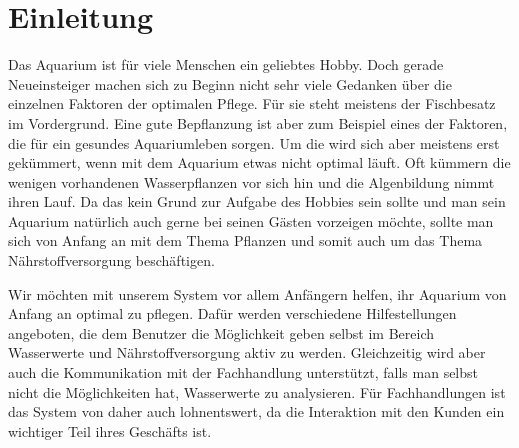 \chapter{Einleitung}

Das Aquarium ist für viele Menschen ein geliebtes Hobby. Doch gerade Neueinsteiger machen sich zu Beginn nicht sehr viele Gedanken über die einzelnen Faktoren der optimalen Pflege. Für sie steht meistens der Fischbesatz im Vordergrund. Eine gute Bepflanzung ist aber zum Beispiel eines der Faktoren, die für ein gesundes Aquariumleben sorgen. Um die wird sich aber meistens erst gekümmert, wenn mit dem Aquarium etwas nicht optimal läuft. Oft kümmern die wenigen vorhandenen Wasserpflanzen vor sich hin und die Algenbildung nimmt ihren Lauf. Da das kein Grund zur Aufgabe des Hobbies sein sollte und man sein Aquarium natürlich auch gerne bei seinen Gästen vorzeigen möchte, sollte man sich von Anfang an mit dem Thema Pflanzen und somit auch um das Thema Nährstoffversorgung beschäftigen.

Wir möchten mit unserem System vor allem Anfängern helfen, ihr Aquarium von Anfang an optimal zu pflegen. Dafür werden verschiedene Hilfestellungen angeboten, die dem Benutzer die Möglichkeit geben selbst im Bereich Wasserwerte und Nährstoffversorgung aktiv zu werden. Gleichzeitig wird aber auch die Kommunikation mit der Fachhandlung unterstützt, falls man selbst nicht die Möglichkeiten hat, Wasserwerte zu analysieren. Für Fachhandlungen ist das System von daher auch lohnentswert, da die Interaktion mit den Kunden ein wichtiger Teil ihres Geschäfts ist.